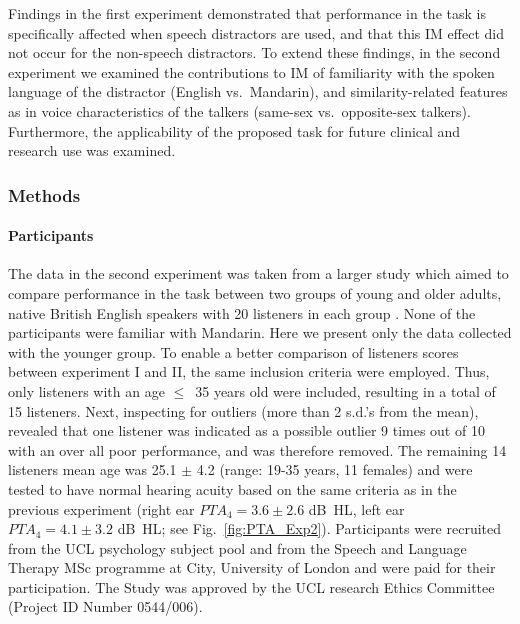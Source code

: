 \documentclass[a4paper, twoside]{templates/ociamthesis}
\begin{document}
Findings in the first experiment demonstrated that performance in the task is specifically affected when speech distractors are used, and that this IM effect did not occur for the non-speech distractors. To extend these findings, in the second experiment we examined the contributions to IM of familiarity with the spoken language of the distractor (English vs.~Mandarin), and similarity-related features as in voice characteristics of the talkers (same-sex vs.~opposite-sex talkers). Furthermore, the applicability of the proposed task for future clinical and research use was examined.\\

\hypertarget{methods-1}{%
\subsubsection{Methods}\label{methods-1}}

\hypertarget{participants-1}{%
\paragraph{Participants}\label{participants-1}}

The data in the second experiment was taken from a larger study which aimed to compare performance in the task between two groups of young and older adults, native British English speakers with 20 listeners in each group \autocite{Huang2018}. None of the participants were familiar with Mandarin. Here we present only the data collected with the younger group. To enable a better comparison of listeners scores between experiment I and II, the same inclusion criteria were employed. Thus, only listeners with an age \(\leq\)~35 years old were included, resulting in a total of 15 listeners. Next, inspecting for outliers (more than 2 s.d.'s from the mean), revealed that one listener was indicated as a possible outlier 9 times out of 10 with an over all poor performance, and was therefore removed. The remaining 14 listeners mean age was 25.1 \(\pm\) 4.2 (range: 19-35 years, 11 females) and were tested to have normal hearing acuity based on the same criteria as in the previous experiment (right ear \(PTA_{4}=3.6 \pm 2.6\) dB~HL, left ear \(PTA_{4}=4.1 \pm 3.2\) dB~HL; see Fig.~\ref{fig:PTA_Exp2}). Participants were recruited from the UCL psychology subject pool and from the Speech and Language Therapy MSc programme at City, University of London and were paid for their participation. The Study was approved by the UCL research Ethics Committee (Project ID Number 0544/006).\\
\end{document}
